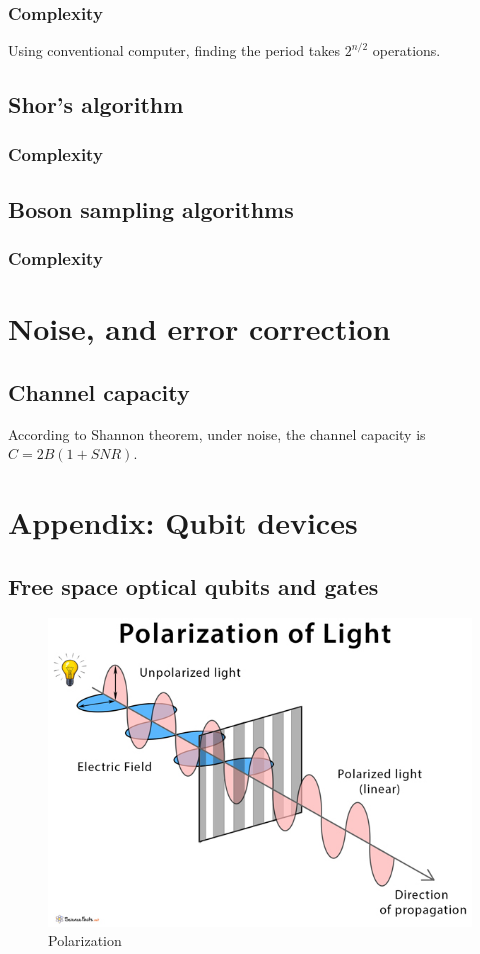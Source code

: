 \documentclass{book}
\begin{document}
\subsection{Complexity}
Using conventional computer, finding the period takes $2^{n/2}$ operations.

\section{Shor's algorithm}

\subsection{Complexity}

\section{Boson sampling algorithms}

\subsection{Complexity}

\chapter{Noise, and error correction}
\section{Channel capacity}
According to Shannon theorem, under noise, the channel capacity is $C = 2B (1+SNR)$.


\chapter{Appendix: Qubit devices}\label{A-qubit}

\section{Free space optical qubits and gates}
\begin{figure}[h]
\includegraphics[width=12cm]{pic/Polarization-of-Light.jpg}
\caption{Polarization}
\label{Polarizer}
\end{figure}
\end{document}
